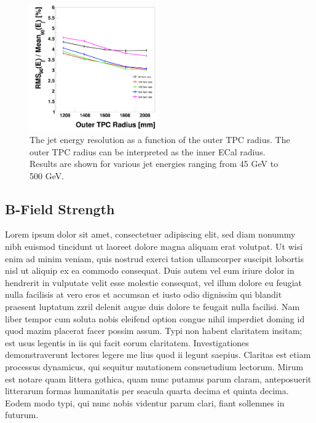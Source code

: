 \documentclass[final,3p,times,twocolumn]{elsarticle}
\begin{document}
\begin{figure}[!h]
  \begin{center}
     \includegraphics[width=0.49\textwidth]{JERvsOuterTPCRadiusHCalTC10ns.png}
      \caption{The jet energy resolution as a function of the outer TPC radius.  The outer TPC radius can be interpreted as the inner ECal radius.  Results are shown for various jet energies ranging from 45 GeV to 500 GeV.\label{}}
  \end{center}
\end{figure}

\subsection{B-Field Strength}
Lorem ipsum dolor sit amet, consectetuer adipiscing elit, sed diam nonummy nibh euismod tincidunt ut laoreet dolore magna aliquam erat volutpat. Ut wisi enim ad minim veniam, quis
nostrud exerci tation ullamcorper suscipit lobortis nisl ut aliquip ex ea commodo consequat. Duis autem vel eum iriure dolor in hendrerit in vulputate velit esse molestie consequat,
vel illum dolore eu feugiat nulla facilisis at vero eros et accumsan et iusto odio dignissim qui blandit praesent luptatum zzril delenit augue duis dolore te feugait nulla facilisi.
Nam liber tempor cum soluta nobis eleifend option congue nihil imperdiet doming id quod mazim placerat facer possim assum. Typi non habent claritatem insitam; est usus legentis in
iis qui facit eorum claritatem. Investigationes demonstraverunt lectores legere me lius quod ii legunt saepius. Claritas est etiam processus dynamicus, qui sequitur mutationem
consuetudium lectorum. Mirum est notare quam littera gothica, quam nunc putamus parum claram, anteposuerit litterarum formas humanitatis per seacula quarta decima et quinta
decima. Eodem modo typi, qui nunc nobis videntur parum clari, fiant sollemnes in futurum.
\end{document}
